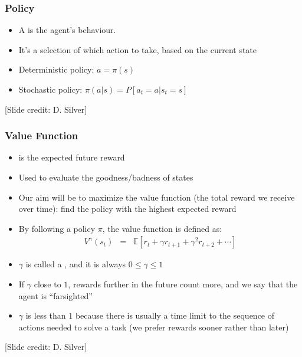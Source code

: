 \documentclass[handout]{beamer}
\begin{document}
\begin{frame}\frametitle{Policy}\small
\begin{itemize}
\item A  is the agent's behaviour.
\item It's a selection of which action to take, based on the current state
\item Deterministic policy: $a = \pi(s)$
\item Stochastic policy: $\pi(a|s) = P[a_t = a|s_t = s]$
\end{itemize}

\vspace{30mm}
\scriptsize [Slide credit: D. Silver]
\end{frame}

\begin{frame}\frametitle{Value Function}\small
\begin{itemize}
\item {} is the expected future reward
\item Used to evaluate the goodness/badness of states
 \item Our aim will be to maximize the value function (the total reward we receive over time): find the policy with the highest expected reward
 \item By following a policy $\pi$, the value function is defined as:
\begin{eqnarray}
V^{\pi}(s_t) &=& \mathbb{E}[r_t + \gamma r_{t+1} + \gamma^2 r_{t+2} + \cdots] \nonumber
\end{eqnarray}
\item $\gamma$ is called a , and it is always $0\leq\gamma\leq 1$
\item If $\gamma$ close to $1$, rewards further in the future count more, and we say that the agent is ``farsighted''
\item $\gamma$ is less than $1$ because there is usually a time limit to the sequence of actions needed to solve a task (we prefer rewards sooner rather than later)
\end{itemize}

\vspace{10mm}
\scriptsize [Slide credit: D. Silver]
\end{frame}
\end{document}
